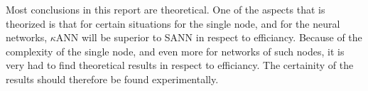 % 

Most conclusions in this report are theoretical. 
One of the aspects that is theorized is that for certain situations for the single node, and for the neural networks, $\kappa$ANN will be superior to SANN in respect to efficiancy.
Because of the complexity of the single node, and even more for networks of such nodes, it is very had to find theoretical results in respect to efficiancy.
The certainity of the results should therefore be found experimentally.


